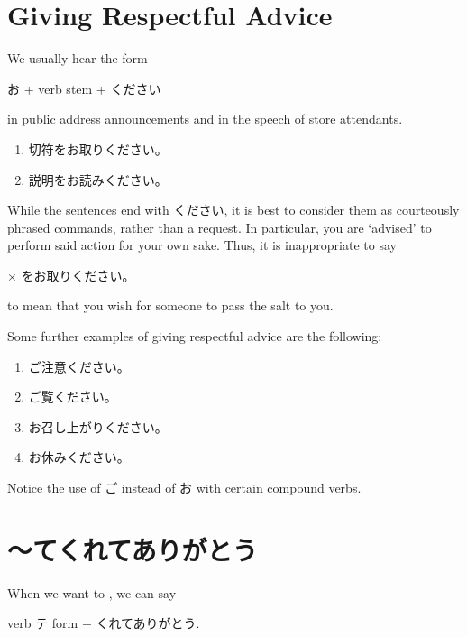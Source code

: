 \documentclass[notoc,notitlepage]{tufte-book}
\begin{document}

\section{Giving Respectful Advice}%
\label{sec:giving_respectful_advice}

We usually hear the form
\begin{center}
  お + verb stem + ください
\end{center}
in public address announcements and in the speech of store attendants.

\begin{eg}
  \begin{enumerate}
    \item 切符をお取りください。
    \item 説明をお読みください。
  \end{enumerate}
\end{eg}

While the sentences end with ください,
it is best to consider them as courteously phrased commands,
rather than a request.
In particular, you are `advised' to perform said action for your own sake.
Thus, it is inappropriate to say
\begin{center}
  $\times$ をお取りください。
\end{center}
to mean that you wish for someone to pass the salt to you.

\begin{eg}
  Some further examples of giving respectful advice are the following:
  \begin{enumerate}
    \item ご注意ください。
    \item ご覧ください。
    \item お召し上がりください。
    \item お休みください。
  \end{enumerate}
  Notice the use of ご instead of お with certain compound verbs.
\end{eg}


\section{〜てくれてありがとう}%
\label{sec:_tekuretearigatou}

\begin{defn}[〜てくれてありがとう]\label{defn:_tekuretearigatou}
  When we want to ,
  we can say
  \begin{center}
    verb テ form + くれてありがとう.
  \end{center}
\end{defn}
\end{document}
